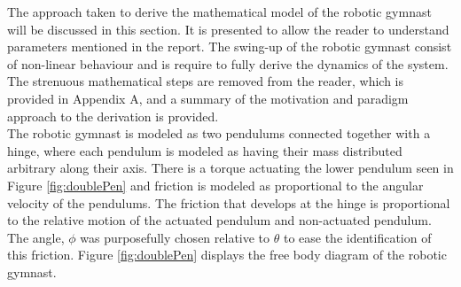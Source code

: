 \documentclass[a4paper,12pt]{article}
\begin{document}
	The approach taken to derive the mathematical model of the robotic gymnast will be discussed in this section. It is presented to allow the reader to understand parameters mentioned in the report. The swing-up of the robotic gymnast consist of non-linear behaviour and is require to fully derive the dynamics of the system. The strenuous mathematical steps are removed from the reader, which is provided in Appendix A, and a summary of the motivation and paradigm approach to the derivation is provided.\\
	
	The robotic gymnast is modeled as two pendulums connected together with a hinge, where each pendulum is modeled as having their mass distributed arbitrary along their axis. There is a torque actuating the lower pendulum seen in Figure \ref{fig:doublePen} and friction is modeled as proportional to the angular velocity of the pendulums. The friction that develops at the hinge is proportional to the relative motion of the actuated pendulum and non-actuated pendulum. The angle, $\phi$ was purposefully chosen relative to $\theta$ to ease the identification of this friction. Figure \ref{fig:doublePen} displays the free body diagram of the robotic gymnast.\\
	
\end{document}
